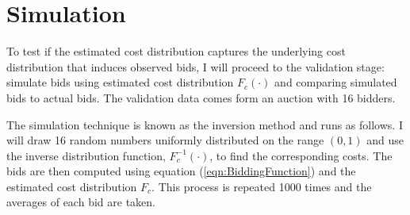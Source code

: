 \documentclass[11pt]{article}
\begin{document}
\section[title]{Simulation} 
To test if the estimated cost distribution captures the underlying cost 
distribution that induces observed bids, I will proceed to the validation stage: 
simulate bids using estimated cost distribution 
$F_c(\cdot)$ and comparing simulated bids to actual bids. 
The validation data comes form an auction with 16 bidders.

The simulation technique is known as the inversion method and runs as follows.
I will draw 16 random numbers uniformly 
distributed on the range $(0 ,1)$ and use the inverse distribution function, 
$F_c^{-1}(\cdot)$, to find the corresponding costs. The bids are then computed 
using equation (\ref{eqn:BiddingFunction}) and the estimated cost distribution 
$F_c$. This process is repeated 1000 times and the averages of each bid are taken. 
\end{document}
